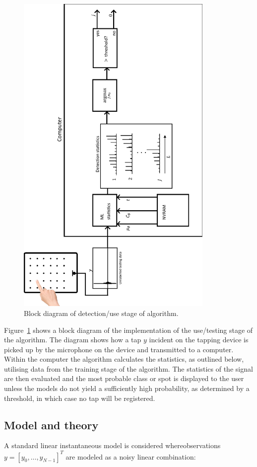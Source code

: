 \begin{figure}[!]
\centering
\includegraphics[width=360px]{testingSystemPlot.pdf}
\caption{Block diagram of detection/use stage of algorithm.}\label{fig:testingSystemPlot}
\end{figure}

Figure~\ref{fig:testingSystemPlot} shows a block diagram of the implementation of the use/testing stage of the algorithm. The diagram shows how a tap $y$ incident on the tapping device is picked up by the microphone on the device and transmitted to a computer. Within the computer the algorithm calculates the statistics, as outlined below, utilising data from the training stage of the algorithm. The statistics of the signal are then evaluated and the most probable class or spot is displayed to the user unless the models do not yield a sufficiently high probability, as determined by a threshold, in which case no tap will be registered.

\subsection{Model and theory}
A standard linear instantaneous model is considered where\linebreak[0] observations \linebreak[0]$y = [y_0, \ldots , y_{N-1}]^T $ are modeled as a noisy linear combination:

